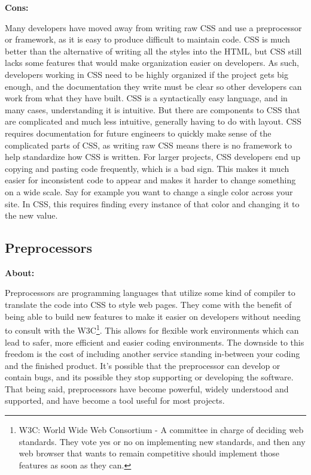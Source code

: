 \documentclass[draftclsnofoot,onecolumn,letterpaper,10pt,compsoc]{IEEEtran}
\begin{document}
    \textbf{Cons:}

    Many developers have moved away from writing raw CSS and use a preprocessor or framework, as it is easy to produce difficult to maintain code.
    CSS is much better than the alternative of writing all the styles into the HTML, but CSS still lacks some features that would make organization easier on developers.
    As such, developers working in CSS need to be highly organized if the project gets big enough, and the documentation they write must be clear so other developers can work from what they have built.
    CSS is a syntactically easy language, and in many cases, understanding it is intuitive.
    But there are components to CSS that are complicated and much less intuitive, generally having to do with layout.
    CSS requires documentation for future engineers to quickly make sense of the complicated parts of CSS, as writing raw CSS means there is no framework to help standardize how CSS is written.
    For larger projects, CSS developers end up copying and pasting code frequently, which is a bad sign.
    This makes it much easier for inconsistent code to appear and makes it harder to change something on a wide scale.
    Say for example you want to change a single color across your site.
    In CSS, this requires finding every instance of that color and changing it to the new value.

  \subsection{Preprocessors}
    \textbf{About:}

    Preprocessors are programming languages that utilize some kind of compiler to translate the code into CSS to style web pages.
    They come with the benefit of being able to build new features to make it easier on developers without needing to consult with the W3C\footnote{W3C: World Wide Web Consortium - A committee in charge of deciding web standards. They vote yes or no on implementing new standards, and then any web browser that wants to remain competitive should implement those features as soon as they can.}.
    This allows for flexible work environments which can lead to safer, more efficient and easier coding environments.
    The downside to this freedom is the cost of including another service standing in-between your coding and the finished product.
    It's possible that the preprocessor can develop or contain bugs, and its possible they stop supporting or developing the software.
    That being said, preprocessors have become powerful, widely understood and supported, and have become a tool useful for most projects.
\end{document}
